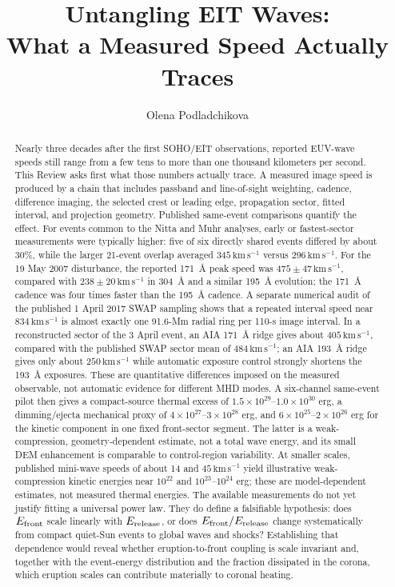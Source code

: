 \documentclass[11pt]{article}
\title{Untangling EIT Waves:\\What a Measured Speed Actually Traces}
\author[1,2]{Olena Podladchikova}
\affil[1]{National Technical University of Ukraine ``Igor Sikorsky Kyiv Polytechnic Institute'', 37 Beresteiskyi Avenue, 03056 Kyiv, Ukraine}
\affil[2]{Leibniz Institute for Astrophysics Potsdam (AIP), An der Sternwarte 16, 14482 Potsdam, Germany}
\affil[]{Corresponding author: \href{mailto:epodlad@gmail.com}{epodlad@gmail.com}}
\date{}
\newcommand{\kms}{\mathrm{km\,s^{-1}}}
\newcommand{\Efront}{E_{\rm front}}
\newcommand{\Erelease}{E_{\rm release}}
\begin{document}
\maketitle

\begin{abstract}
Nearly three decades after the first SOHO/EIT observations, reported EUV-wave speeds still range from a few tens to more than one thousand kilometers per second. This Review asks first what those numbers actually trace. A measured image speed is produced by a chain that includes passband and line-of-sight weighting, cadence, difference imaging, the selected crest or leading edge, propagation sector, fitted interval, and projection geometry. Published same-event comparisons quantify the effect. For events common to the Nitta and Muhr analyses, early or fastest-sector measurements were typically higher: five of six directly shared events differed by about 30\%, while the larger 21-event overlap averaged $345\,\kms$ versus $296\,\kms$. For the 19 May 2007 disturbance, the reported 171~\AA{} peak speed was $475\pm47\,\kms$, compared with $238\pm20\,\kms$ in 304~\AA{} and a similar 195~\AA{} evolution; the 171~\AA{} cadence was four times faster than the 195~\AA{} cadence. A separate numerical audit of the published 1 April 2017 SWAP sampling shows that a repeated interval speed near $834\,\kms$ is almost exactly one 91.6-Mm radial ring per 110-s image interval. In a reconstructed sector of the 3 April event, an AIA 171~\AA{} ridge gives about $405\,\kms$, compared with the published SWAP sector mean of $484\,\kms$; an AIA 193~\AA{} ridge gives only about $250\,\kms$ while automatic exposure control strongly shortens the 193~\AA{} exposures. These are quantitative differences imposed on the measured observable, not automatic evidence for different MHD modes. A six-channel same-event pilot then gives a compact-source thermal excess of $1.5\times10^{29}$--$1.0\times10^{30}$ erg, a dimming/ejecta mechanical proxy of $4\times10^{27}$--$3\times10^{28}$ erg, and $6\times10^{25}$--$2\times10^{26}$ erg for the kinetic component in one fixed front-sector segment. The latter is a weak-compression, geometry-dependent estimate, not a total wave energy, and its small DEM enhancement is comparable to control-region variability. At smaller scales, published mini-wave speeds of about 14 and $45\,\kms$ yield illustrative weak-compression kinetic energies near $10^{22}$ and $10^{23}$--$10^{24}$ erg; these are model-dependent estimates, not measured thermal energies. The available measurements do not yet justify fitting a universal power law. They do define a falsifiable hypothesis: does $\Efront$ scale linearly with $\Erelease$, or does $\Efront/\Erelease$ change systematically from compact quiet-Sun events to global waves and shocks? Establishing that dependence would reveal whether eruption-to-front coupling is scale invariant and, together with the event-energy distribution and the fraction dissipated in the corona, which eruption scales can contribute materially to coronal heating.
\end{abstract}
\end{document}
